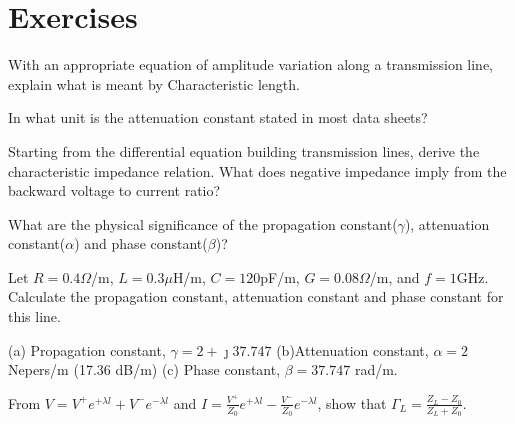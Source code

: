 \section*{Exercises}
\begin{ExerciseList}
\Exercise[label={ex31}]
With an appropriate equation of amplitude variation along a transmission line, explain what is meant by Characteristic length.

\Exercise[label={ex32}]
In what unit is the attenuation constant stated in most data sheets?

\Exercise[label={ex33}]
Starting from the differential equation building transmission lines, derive the characteristic impedance relation. What does negative impedance imply from the backward voltage to current ratio?

\Exercise[label={ex34}]
What are the physical significance of the propagation constant($\gamma$), attenuation constant($\alpha$) and phase constant($\beta$)?

\Exercise[label={ex35}]
Let $R = 0.4\varOmega$/m, $L = 0.3\mu$H/m, $C = 120$pF/m, $G = 0.08\varOmega$/m, and $f = 1$GHz. Calculate the propagation constant, attenuation constant and phase constant for this line.

\Answer[ref={ex35}]
(a) Propagation constant, $\gamma = 2 +\jmath 37.747$ (b)Attenuation constant, $\alpha = 2$ Nepers/m (17.36 dB/m) (c) Phase constant, $\beta = 37.747 $ rad/m.

\Exercise[label={ex36}]
From $ V = V^+e^{+\lambda l} + V^-e^{-\lambda l} $ and $ I = \frac{V^+}{Z_0}e^{+\lambda l} - \frac{V^-}{Z_0}e^{-\lambda l}$, show that $ \Gamma_L = \frac{Z_L - Z_0}{Z_L + Z_0} $.
\end{ExerciseList}